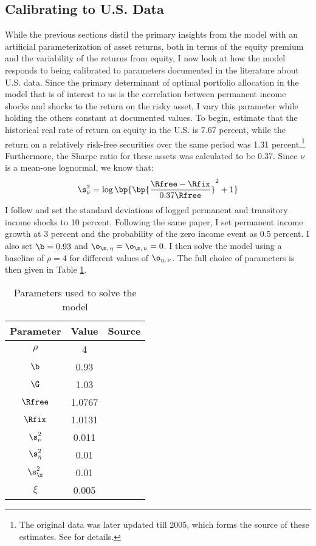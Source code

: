 \subsection{Calibrating to U.S. Data}\label{us_data}

While the previous sections distil the primary insights from the model with an artificial parameterization of asset returns, both in terms of the equity premium and the variability of the returns from equity, I now look at how the model responds to being calibrated to parameters documented in the literature about U.S. data. Since the primary determinant of optimal portfolio allocation in the model that is of interest to us is the correlation between permanent income shocks and shocks to the return on the risky asset, I vary this parameter while holding the others constant at documented values. To begin, \citet{Mehra1985} estimate that the historical real rate of return on equity in the U.S. is 7.67 percent, while the return on a relatively risk-free securities over the same period was 1.31 percent.\footnote{The original data was later updated till 2005, which forms the source of these estimates. See \citet{Mehra2006} for details.} Furthermore, the Sharpe ratio for these assets was calculated to be 0.37. Since $\nu$ is a mean-one lognormal, we know that:
\[
\s_{\nu}^2 = \log\bp{\bp{\frac{\Rfree - \Rfix}{0.37\Rfree}}^2 + 1}
\]
I follow \citet{Carroll1992} and set the standard deviations of logged permanent and transitory income shocks to 10 percent. Following the same paper, I set permanent income growth at 3 percent and the probability of the zero income event as 0.5 percent. I also set $\b = 0.93$ and $\o_{\z,\,\eta} = \o_{\z,\,\nu} = 0$. I then solve the model using a baseline of $\rho = 4$ for different values of $\o_{\eta,\,\nu}$. The full choice of parameters is then given in Table \ref{tab:model_parameters}.

\begin{table}[htbp]
    \begin{tabular}{ccc}
        \toprule
        Parameter & Value & Source\\
        \midrule
        $\rho$ & 4\\
        $\b$ & 0.93\\
        $\G$ & 1.03 & \citet{Carroll1992}\\
        $\Rfree$ & 1.0767 & \citet{Mehra2006}\\
        $\Rfix$ & 1.0131 & \citet{Mehra2006}\\
        $\s_{\nu}^2$ & 0.011 & \citet{Mehra2006}\\
        $\s_{\eta}^2$ & 0.01 & \citet{Carroll1992}\\
        $\s_{\z}^2$ & 0.01 & \citet{Carroll1992}\\
        $\xi$ & 0.005 & \citet{Carroll1992}\\
        \bottomrule
    \end{tabular}
    \caption{Parameters used to solve the model}
    \label{tab:model_parameters}
\end{table}

